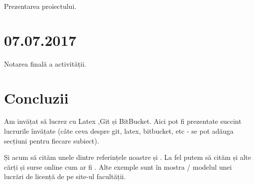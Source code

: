 \documentclass{report}
\begin{document}
Prezentarea proiectului.

\chapter{07.07.2017}



Notarea finală a activității.



\chapter{Concluzii}

\Large{Am invățat să lucrez cu Latex ,Git și BitBucket. Aici pot fi prezentate succint lucrurile învățate (câte ceva despre git, latex, bitbucket, etc - se pot adăuga secțiuni pentru fiecare subiect). 



Și acum să cităm unele dintre referințele noastre \cite{DUMMY:1} și \cite{book:25008}. La fel putem să cităm și alte cărți și surse online cum ar fi \cite{book:776133, book:1045183}. Alte exemple sunt în mostra / modelul unei lucrări de licență de pe site-ul facultății. }






 


\end{document}
